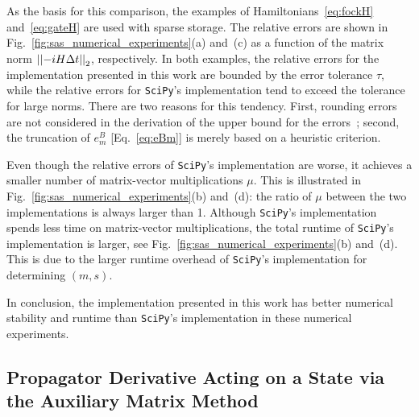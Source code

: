 As the basis for this comparison, the examples of Hamiltonians~\eqref{eq:fockH} and~\eqref{eq:gateH} are used with sparse storage. The relative errors are shown in Fig.~\ref{fig:sas_numerical_experiments}(a) and~(c) as a function of the matrix norm $\left|\left|-iH\Delta t\right|\right|_2$, respectively. In both examples, the relative errors for the implementation presented in this work are bounded by the error tolerance $\tau$, while the relative errors for \texttt{SciPy}'s implementation tend to exceed the tolerance for large norms. There are two reasons for this tendency. First, rounding errors are not considered in the derivation of the upper bound for the errors~\cite{al2011computing}; second, the truncation of $e^B_m$ [Eq.~\eqref{eq:eBm}] is merely based on a heuristic criterion. 

Even though the relative errors of \texttt{SciPy}'s implementation are worse, it achieves a smaller number of matrix-vector multiplications $\mu$. This is illustrated in Fig.~\ref{fig:sas_numerical_experiments}(b) and~(d): the ratio of $\mu$ between the two implementations is always larger than 1. Although \texttt{SciPy}'s implementation spends less time on matrix-vector multiplications, the total runtime of \texttt{SciPy}'s implementation is larger, see Fig.~\ref{fig:sas_numerical_experiments}(b) and~(d). This is due to the larger runtime overhead of \texttt{SciPy}'s implementation for determining $(m,s)$. 

In conclusion, the implementation presented in this work has better numerical stability and runtime than \texttt{SciPy}'s implementation in these numerical experiments. 

\subsection{Propagator Derivative Acting on a State via the Auxiliary Matrix Method}
\label{subsec:auxiliary-matrix}

